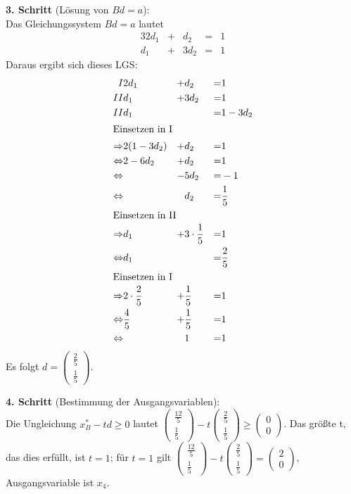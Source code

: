 \documentclass[10pt,a4paper,oneside,ngerman,numbers=noenddot]{scrartcl}
\begin{document}
		\textbf{3. Schritt} (Lösung von $Bd = a$):\\
		Das Gleichungssystem $Bd = a$ lautet
		\begin{alignat*}{3}
			2d_{1} &+& d_{2} &=& 1\\
			d_{1} &+& 3d_{2} &=& 1
		\end{alignat*}
		Daraus ergibt sich dieses LGS:
		\begin{alignat*}{3}
			I & 2d_{1} &+& d_{2} &=& 1 \\
			II & d_{1} &+& 3d_{2} &=& 1 \\
			II & d_{1} && &=& 1 - 3d_{2} \\
			\intertext{Einsetzen in I}
			\Rightarrow & 2(1 - 3d_{2}) &+& d_{2} &=& 1 \\
			\Leftrightarrow & 2 - 6d_{2} &+& d_{2} &=& 1 \\
			\Leftrightarrow & &-& 5d_{2} &=& -1 \\
			\Leftrightarrow & && d_{2} &=& \frac{1}{5} \\
			\intertext{Einsetzen in II}
			\Rightarrow & d_{1} &+& 3 \cdot \frac{1}{5} &=& 1 \\
			\Leftrightarrow & d_{1} && &=& \frac{2}{5} \\
			\intertext{Einsetzen in I}
			\Rightarrow & 2 \cdot \frac{2}{5} &+& \frac{1}{5} &=& 1 \\
			\Leftrightarrow & \frac{4}{5} &+& \frac{1}{5} &=& 1 \\
			\Leftrightarrow & && 1 &=& 1
		\end{alignat*}
		Es folgt $d = \begin{pmatrix} \frac{2}{5} \\ \frac{1}{5} \end{pmatrix}$.
		
		\textbf{4. Schritt} (Bestimmung der Ausgangsvariablen):\\
		Die Ungleichung $x_{B}^{*} - td \geq 0$ lautet $\begin{pmatrix} \frac{12}{5} \\ \frac{1}{5} \end{pmatrix} - t \begin{pmatrix} \frac{2}{5} \\ \frac{1}{5} \end{pmatrix} \geq \begin{pmatrix} 0 \\ 0  \end{pmatrix}$. Das größte t, das dies erfüllt, ist $t = 1$; für $t = 1$ gilt $\begin{pmatrix} \frac{12}{5} \\ \frac{1}{5}\end{pmatrix} - t \begin{pmatrix} \frac{2}{5} \\ \frac{1}{5} \end{pmatrix} = \begin{pmatrix} 2 \\ 0 \end{pmatrix}$, Ausgangsvariable ist $x_{4}$.
		
\end{document}
